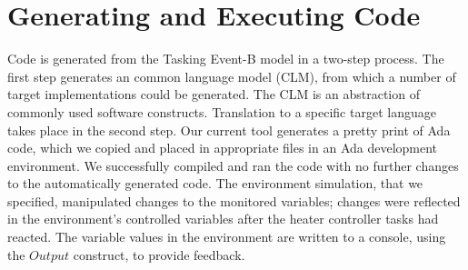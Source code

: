 \section{Generating and Executing Code}\label{CG}
Code is generated from the Tasking Event-B model in a two-step process. The first step generates an common language model (CLM), from which a number of target implementations could be generated. The CLM is an abstraction of commonly used software constructs. Translation to a specific target language takes place in the second step. Our current tool generates a pretty print of Ada code, which we copied and placed in appropriate files in an Ada development environment. We successfully compiled and ran the code with no further changes to the automatically generated code.  The environment simulation, that we specified, manipulated changes to the monitored variables; changes were reflected in the environment's controlled variables after the heater controller tasks had reacted. The variable values in the environment are written to a console, using the $Output$ construct, to provide feedback.  
